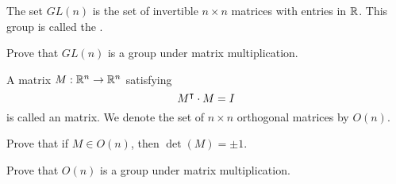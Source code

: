 \documentclass{ximera}
\begin{document}
\begin{definition}
  The set $GL(n)$ is the set of invertible $n\times n$ matrices with
  entries in $\mathbb R$. This group is called the .
\end{definition}

\begin{exercise}
  Prove that $GL(n)$ is a group under matrix multiplication.
\end{exercise}



\begin{definition}
  A matrix $M:\mathbb R^n\to \mathbb R^n$ satisfying
  \[
  M^\intercal \cdot M=I
  \]
  is called an  matrix. We denote the set of $n\times
  n$ orthogonal matrices by $O(n)$.
\end{definition}


\begin{exercise}
  Prove that if $M\in O(n)$, then $\det(M) = \pm 1$.
\end{exercise}


\begin{exercise}
  Prove that $O(n)$ is a group under matrix multiplication.
\end{exercise}
\end{document}
